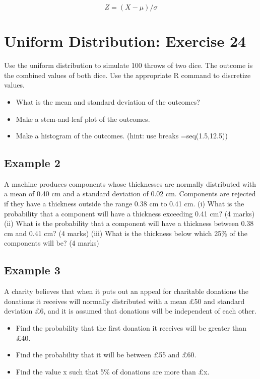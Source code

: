 \documentclass[12pt]{report}
\begin{document}
\begin{equation}
Z = ( X - \mu ) / \sigma
\end{equation}

\section*{Uniform Distribution: Exercise 24}

Use the uniform distribution to simulate 100 throws of two dice. The outcome is the combined values of both dice. Use the appropriate R command to discretize values.
\begin{itemize}
	\item  What is the mean and standard deviation of the outcomes?
	\item  Make a stem-and-leaf plot of the outcomes.
	\item Make a histogram of the outcomes. (hint: use breaks =seq(1.5,12.5))
\end{itemize}



\subsection{Example 2}
A machine produces components whose thicknesses are normally
distributed with a mean of 0.40 cm and a standard deviation of 0.02 cm.
Components are rejected if they have a thickness outside the range 0.38 cm
to 0.41 cm.
(i) What is the probability that a component will have a thickness
exceeding 0.41 cm? (4 marks)
(ii) What is the probability that a component will have a thickness between
0.38 cm and 0.41 cm? (4 marks)
(iii) What is the thickness below which 25\% of the components will be? (4 marks)
\subsection{Example 3}
A charity believes that when it puts out an appeal for charitable donations the
donations it receives will normally distributed with a mean £50 and standard
deviation £6, and it is assumed that donations will be independent of each
other.
\begin{itemize}
	\item Find the probability that the first donation it receives will be greater
	than £40.
	\item Find the probability that it will be between £55 and £60.
	\item Find the value x such that 5\% of donations are more than £x.
\end{itemize}
\end{document}
